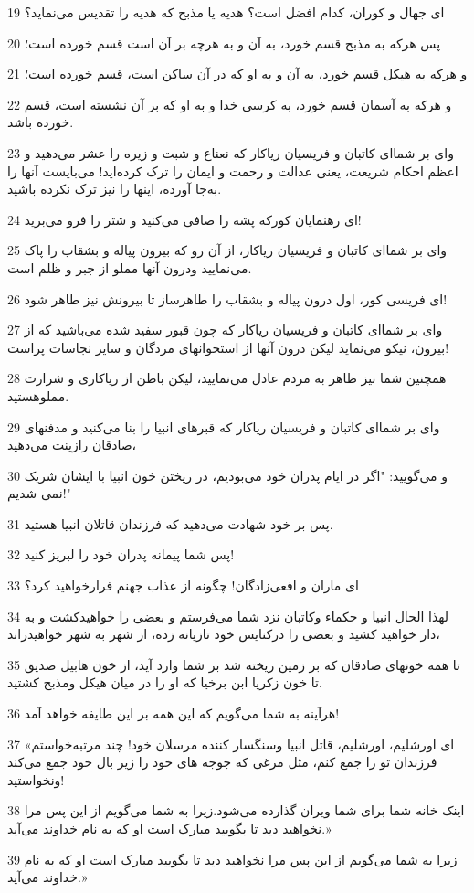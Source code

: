 \par 19 ‌ای جهال و کوران، کدام افضل است؟ هدیه یا مذبح که هدیه را تقدیس می‌نماید؟
\par 20 پس هر‌که به مذبح قسم خورد، به آن و به هرچه بر آن است قسم خورده است؛
\par 21 و هر‌که به هیکل قسم خورد، به آن و به او که در آن ساکن است، قسم خورده است؛
\par 22 و هر‌که به آسمان قسم خورد، به کرسی خدا و به او که بر آن نشسته است، قسم خورده باشد.
\par 23 وای بر شما‌ای کاتبان و فریسیان ریاکار که نعناع و شبت و زیره را عشر می‌دهید و اعظم احکام شریعت، یعنی عدالت و رحمت و ایمان را ترک کرده‌اید! می‌بایست آنها را به‌جا آورده، اینها را نیز ترک نکرده باشید.
\par 24 ‌ای رهنمایان کورکه پشه را صافی می‌کنید و شتر را فرو می‌برید!
\par 25 وای بر شما‌ای کاتبان و فریسیان ریاکار، از آن رو که بیرون پیاله و بشقاب را پاک می‌نمایید ودرون آنها مملو از جبر و ظلم است.
\par 26 ‌ای فریسی کور، اول درون پیاله و بشقاب را طاهرساز تا بیرونش نیز طاهر شود!
\par 27 وای بر شما‌ای کاتبان و فریسیان ریاکار که چون قبور سفید شده می‌باشید که از بیرون، نیکو می‌نماید لیکن درون آنها از استخوانهای مردگان و سایر نجاسات پراست!
\par 28 همچنین شما نیز ظاهر به مردم عادل می‌نمایید، لیکن باطن از ریاکاری و شرارت مملوهستید.
\par 29 وای بر شما‌ای کاتبان و فریسیان ریاکار که قبرهای انبیا را بنا می‌کنید و مدفنهای صادقان رازینت می‌دهید،
\par 30 و می‌گویید: "اگر در ایام پدران خود می‌بودیم، در ریختن خون انبیا با ایشان شریک نمی شدیم!"
\par 31 پس بر خود شهادت می‌دهید که فرزندان قاتلان انبیا هستید.
\par 32 پس شما پیمانه پدران خود را لبریز کنید!
\par 33 ‌ای ماران و افعی‌زادگان! چگونه از عذاب جهنم فرارخواهید کرد؟
\par 34 لهذا الحال انبیا و حکماء وکاتبان نزد شما می‌فرستم و بعضی را خواهیدکشت و به دار خواهید کشید و بعضی را درکنایس خود تازیانه زده، از شهر به شهر خواهیدراند،
\par 35 تا همه خونهای صادقان که بر زمین ریخته شد بر شما وارد آید، از خون هابیل صدیق تا خون زکریا ابن برخیا که او را در میان هیکل ومذبح کشتید.
\par 36 هرآینه به شما می‌گویم که این همه بر این طایفه خواهد آمد!
\par 37 «ای اورشلیم، اورشلیم، قاتل انبیا وسنگسار کننده مرسلان خود! چند مرتبه‌خواستم فرزندان تو را جمع کنم، مثل مرغی که جوجه های خود را زیر بال خود جمع می‌کند ونخواستید!
\par 38 اینک خانه شما برای شما ویران گذارده می‌شود.زیرا به شما می‌گویم از این پس مرا نخواهید دید تا بگویید مبارک است او که به نام خداوند می‌آید.»
\par 39 زیرا به شما می‌گویم از این پس مرا نخواهید دید تا بگویید مبارک است او که به نام خداوند می‌آید.»

